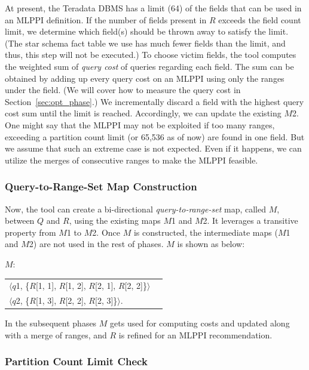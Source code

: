 \documentclass[runningheads]{comsis2}
\begin{document}
At present, the Teradata DBMS has a limit (64) of the fields 
that can be used in an MLPPI definition.
If the number of fields present in $R$ exceeds the field count limit, 
we determine which field(s) should be thrown away to satisfy the limit. 
(The star schema fact table we use has much fewer fields than the limit, 
and thus, this step will not be executed.)
To choose victim fields, the tool computes the weighted sum of 
{\em query cost} of queries regarding each field. 
The sum can be obtained by adding up every query cost on an MLPPI using 
only the ranges under the field. 
(We will cover how to measure the query cost in Section~\ref{sec:opt_phase}.) 
We incrementally discard a field with the highest query cost sum 
until the limit is reached. 
Accordingly, we can update the existing $M$2. 
One might say that the MLPPI may not be exploited if too many ranges, 
exceeding a partition count limit (or 65,536 as of now) are found in one field. 
But we assume that such an extreme case is not expected. Even if 
it happens, we can utilize the merges of consecutive ranges to make 
the MLPPI feasible. 

\subsubsection{Query-to-Range-Set Map Construction}

Now, the tool can create a bi-directional {\em query-to-range-set} map, called $M$, 
between $Q$ and $R$, using the existing maps $M$1 and $M$2. 
It leverages a transitive property from $M$1 to $M$2.
Once $M$ is constructed, 
the intermediate maps ($M$1 and $M$2) are not used in the rest of phases. 
$M$ is shown as below:

{\it $M$}:
\begin{center}
\begin{tabular}{ll} 
$\langle${$q$1}, \{$R$[1, 1], $R$[1, 2], $R$[2, 1], $R$[2, 2]\}$\rangle$ \\
$\langle${$q$2}, \{$R$[1, 3], $R$[2, 2], $R$[2, 3]\}$\rangle$.
\end{tabular}
\end{center} 

In the subsequent phases $M$ gets used for computing costs and updated 
along with a merge of ranges, and $R$ is refined for an MLPPI recommendation. 

\subsubsection{Partition Count Limit Check}
\end{document}
